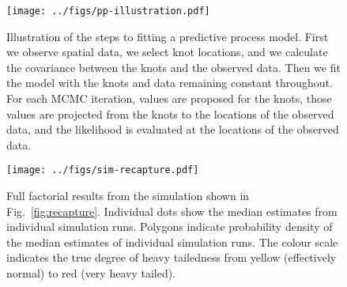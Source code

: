 \documentclass[12pt,english]{article}
\begin{document}
\renewcommand{\thefigure}{S\arabic{figure}}
\renewcommand{\thetable}{S\arabic{table}}
\setcounter{figure}{0}
\setcounter{table}{0}

\begin{figure}[htb]
  \begin{center}
    \texttt{[image: ../figs/pp-illustration.pdf]}
    \caption{
      Illustration of the steps to fitting a predictive process model.
      First we observe spatial data, we select knot locations,
      and we calculate the covariance between the knots and the observed data.
      Then we fit the model with the knots and data remaining constant throughout.
      For each MCMC iteration, values are proposed for the
      knots, those values are projected from the knots to the locations of the observed data,
      and the likelihood is evaluated at the locations of the observed data.}
    \label{fig:didactic}
  \end{center}
\end{figure}

\clearpage

\begin{figure}[htb]
  \begin{center}
    \texttt{[image: ../figs/sim-recapture.pdf]}
    \caption{
      Full factorial results from the simulation shown in Fig.~\ref{fig:recapture}.
      Individual dots show the median estimates from individual simulation runs.
      Polygons indicate probability density of the median estimates of
      individual simulation runs.
      The colour scale indicates the true degree of heavy tailedness from
      yellow (effectively normal) to red (very heavy tailed).
    }
    \label{fig:recapture-factorial}
  \end{center}
\end{figure}

\renewcommand\theadfont{\scriptsize}
\renewcommand\theadalign{cl}
\end{document}
